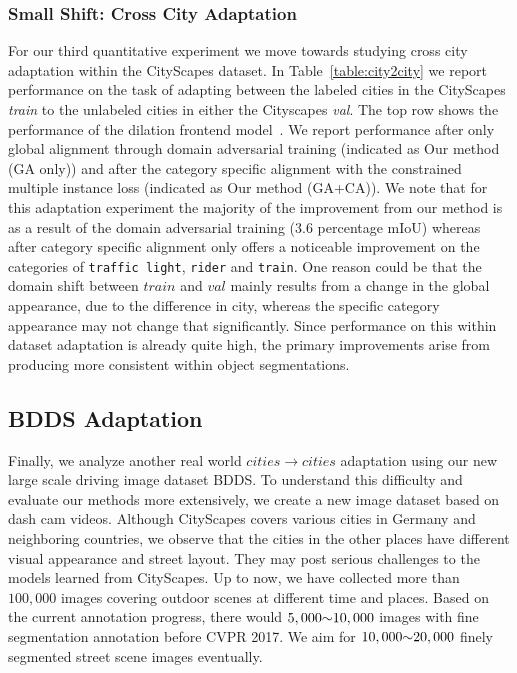 \documentclass[10pt,twocolumn,letterpaper]{article}
\begin{document}
\subsubsection{Small Shift: Cross City Adaptation}
For our third quantitative experiment we move towards studying cross city adaptation within the CityScapes dataset. 
In Table~\ref{table:city2city} we report performance on the task of adapting between the labeled cities in the CityScapes \textit{train} to the unlabeled cities in either the Cityscapes \textit{val}. The top row shows the performance of the dilation frontend model~\cite{yu2016multi}.
We report performance after only global alignment through domain adversarial training (indicated as Our method (GA only)) and after the category specific alignment with the constrained multiple instance loss (indicated as Our method (GA+CA)). 
We note that for this adaptation experiment the majority of the improvement from our method is as a result of the domain adversarial training ($3.6$ percentage mIoU) whereas after category specific alignment only offers a noticeable improvement on the categories of \texttt{traffic light}, \texttt{rider} and \texttt{train}. 
One reason could be that the domain shift between $train$ and $val$ mainly results from a change in the global appearance, due to the difference in city, whereas the specific category appearance may not change that significantly. 
Since performance on this within dataset adaptation is already quite high, the primary improvements arise from producing more consistent within object segmentations.

\subsection{BDDS Adaptation}
Finally, we analyze another real world $cities\rightarrow cities$ adaptation using our new large scale driving image dataset BDDS.
To understand this difficulty and evaluate our methods more extensively, we create a new image dataset based on dash cam videos. Although CityScapes covers various cities in Germany and neighboring countries, we observe that the cities in the other places have different visual appearance and street layout. They may post serious challenges to the models learned from CityScapes.
Up to now, we have collected more than $100,000$ images covering outdoor scenes at different time and places. Based on the current annotation progress, there would $5,000 \scriptsize{\sim} 10,000$ images with fine segmentation annotation before CVPR 2017. We aim for $10,000 \scriptsize{\sim} 20,000$ finely segmented street scene images eventually. 
\end{document}

